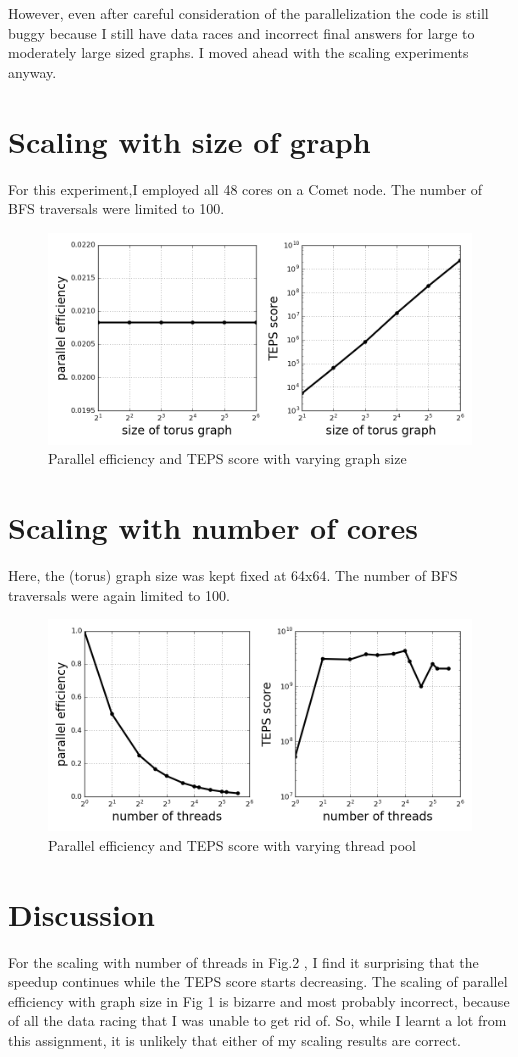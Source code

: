 \documentclass[12pt,letterpaper]{article}
\begin{document}
\noindent However, even after careful consideration of the parallelization the code is still buggy because I still have data races and incorrect final answers for large to moderately large sized graphs. I moved ahead with the scaling experiments anyway.

\section*{Scaling with size of graph}
\noindent For this experiment,I employed all 48 cores on a Comet node. The number of BFS traversals were limited to 100.
\begin{figure}[h!]
\centering
\includegraphics[scale=0.5]{scalegraph.png}
\caption{Parallel efficiency and TEPS score with varying graph size}
\end{figure}

\newpage
\section*{Scaling with number of cores}
\noindent Here, the (torus) graph size was kept fixed at 64x64. The number of BFS traversals were again limited to 100.
\begin{figure}[h!]
\centering
\includegraphics[scale=0.5]{scalecore.png}
\caption{Parallel efficiency and TEPS score with varying thread pool}
\end{figure}

\section*{Discussion}
\noindent For the scaling with number of threads in Fig.2 , I find it surprising that the speedup continues while the TEPS score starts decreasing. The scaling of parallel efficiency with graph size in Fig 1 is bizarre and most probably incorrect, because of all the data racing that I was unable to get rid of. So, while I learnt a lot from this assignment, it is unlikely that either of my scaling results are correct.
\end{document}
